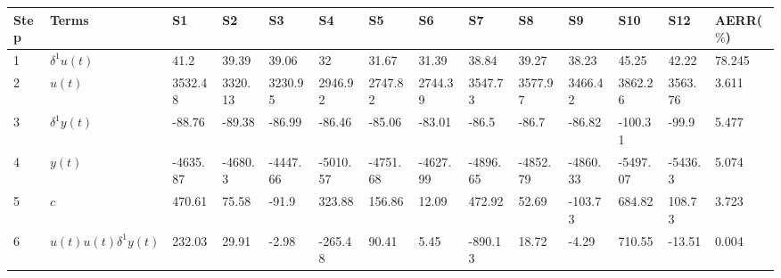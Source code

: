 \begin{tabular}{llllllllllllll}
Step & Terms & S1 & S2 & S3 & S4 & S5 & S6 & S7 & S8 & S9 & S10 & S12 & AERR($\%$) \\ 
\hline 
1 & $\delta^1 u(t)$ & 41.2 & 39.39 & 39.06 & 32 & 31.67 & 31.39 & 38.84 & 39.27 & 38.23 & 45.25 & 42.22 & 78.245 \\ 
2 & $u(t)$ & 3532.48 & 3320.13 & 3230.95 & 2946.92 & 2747.82 & 2744.39 & 3547.73 & 3577.97 & 3466.42 & 3862.26 & 3563.76 & 3.611 \\ 
3 & $\delta^1 y(t)$ & -88.76 & -89.38 & -86.99 & -86.46 & -85.06 & -83.01 & -86.5 & -86.7 & -86.82 & -100.31 & -99.9 & 5.477 \\ 
4 & $y(t)$ & -4635.87 & -4680.3 & -4447.66 & -5010.57 & -4751.68 & -4627.99 & -4896.65 & -4852.79 & -4860.33 & -5497.07 & -5436.3 & 5.074 \\ 
5 & $c$ & 470.61 & 75.58 & -91.9 & 323.88 & 156.86 & 12.09 & 472.92 & 52.69 & -103.73 & 684.82 & 108.73 & 3.723 \\ 
6 & $u(t)u(t)\delta^1 y(t)$ & 232.03 & 29.91 & -2.98 & -265.48 & 90.41 & 5.45 & -890.13 & 18.72 & -4.29 & 710.55 & -13.51 & 0.004 \\ 
\hline 
\end{tabular}